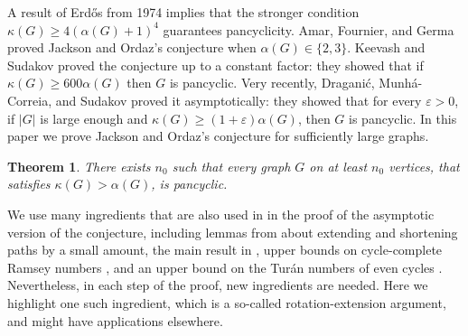 \documentclass[11pt,english]{article}
\theoremstyle{plain}
\newtheorem{theorem}{Theorem}[section]
\theoremstyle{definition}
\theoremstyle{remark}
\newcommand{\eps}{\varepsilon}
\begin{document}
	A result of Erd\H{o}s \cite{erdos1974some} from 1974 implies that the stronger condition $\kappa(G) \ge 4(\alpha(G) + 1)^4$ guarantees pancyclicity. 
	Amar, Fournier, and Germa \cite{amar1991pancyclism} proved Jackson and Ordaz's conjecture when $\alpha(G) \in \{2,3\}$. Keevash and Sudakov \cite{keevash2010pancyclicity} proved the conjecture up to a constant factor: they showed that if $\kappa(G) \ge 600 \alpha(G)$ then $G$ is pancyclic. Very recently, Dragani\'c, Munh\'a-Correia, and Sudakov \cite{draganic2023chvatal} proved it asymptotically: they showed that for every $\eps > 0$, if $|G|$ is large enough and $\kappa(G) \ge (1 + \eps)\alpha(G)$, then $G$ is pancyclic.
	In this paper we prove Jackson and Ordaz's conjecture for sufficiently large graphs.

	\begin{theorem} \label{thm:main}
		There exists $n_0$ such that every graph $G$ on at least $n_0$ vertices, that satisfies $\kappa(G) > \alpha(G)$, is pancyclic.
	\end{theorem}
	
	We use many ingredients that are also used in \cite{draganic2023chvatal} in the proof of the asymptotic version of the conjecture, including lemmas from \cite{draganic2022pancyclicity,draganic2023chvatal} about extending and shortening paths by a small amount, the main result in \cite{draganic2022pancyclicity}, upper bounds on cycle-complete Ramsey numbers \cite{keevash2021cycle,erdos1978cycle}, and an upper bound on the Tur\'an numbers of even cycles \cite{bondy1974cycles}. Nevertheless, in each step of the proof, new ingredients are needed. Here we highlight one such ingredient, which is a so-called rotation-extension argument, and might have applications elsewhere.
\end{document}
